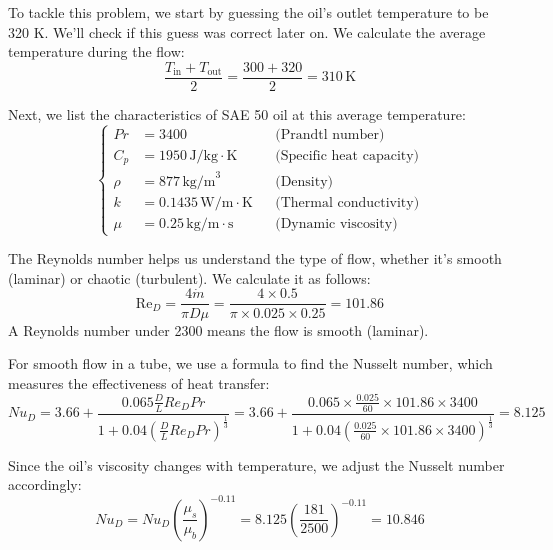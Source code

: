\documentclass{article}
\numberwithin{equation}{section}
\begin{document}
To tackle this problem, we start by guessing the oil's outlet temperature to be 320 K. We'll check if this guess was correct later on. We calculate the average temperature during the flow:
\begin{equation}
    \frac{T_{\text{in}} + T_{\text{out}}}{2} = \frac{300 + 320}{2} = 310 \, \text{K}
\end{equation}

Next, we list the characteristics of SAE 50 oil at this average temperature:
\begin{equation}
\left\{
\begin{aligned}
    Pr &= 3400 && \text{(Prandtl number)} \\
    C_{p} &= 1950 \, \text{J/kg} \cdot \text{K} && \text{(Specific heat capacity)} \\
    \rho &= 877 \, \text{kg/m}^3 && \text{(Density)} \\
    k &= 0.1435 \, \text{W/m} \cdot \text{K} && \text{(Thermal conductivity)} \\
    \mu &= 0.25 \, \text{kg/m} \cdot \text{s} && \text{(Dynamic viscosity)}
\end{aligned}
\right.
\end{equation}

The Reynolds number helps us understand the type of flow, whether it's smooth (laminar) or chaotic (turbulent). We calculate it as follows:
\begin{equation}
    \text{Re}_{D} = \frac{4 \dot{m}}{\pi D \mu} = \frac{4 \times 0.5}{\pi \times 0.025 \times 0.25} = 101.86
\end{equation}
A Reynolds number under 2300 means the flow is smooth (laminar).

For smooth flow in a tube, we use a formula to find the Nusselt number, which measures the effectiveness of heat transfer:
\begin{equation}
    Nu_{D} = 3.66 + \frac{0.065 \frac{D}{L} Re_{D} Pr}{1 + 0.04 \left(\frac{D}{L} Re_{D} Pr\right)^{\frac{1}{3}}} = 3.66 + \frac{0.065 \times \frac{0.025}{60} \times 101.86 \times 3400}{1 + 0.04 \left(\frac{0.025}{60} \times 101.86 \times 3400\right)^{\frac{1}{3}}} = 8.125
\end{equation}

Since the oil's viscosity changes with temperature, we adjust the Nusselt number accordingly:
\begin{equation}
    Nu_{D} = Nu_{D} \left(\frac{\mu_{s}}{\mu_{b}}\right)^{-0.11} = 8.125 \left(\frac{181}{2500}\right)^{-0.11} = 10.846
\end{equation}
\end{document}
